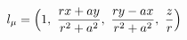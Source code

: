 \documentclass[preview]{standalone}
\begin{document}
\begin{align*}
\special{dvisvgm:raw <g id='unique000'>}l_\mu = \Big(1,\ \frac{rx+ay}{r^2+a^2},\ \frac{ry-ax}{r^2+a^2},\ \frac{z}{r}\Big)\special{dvisvgm:raw </g>}
\end{align*}
\end{document}
